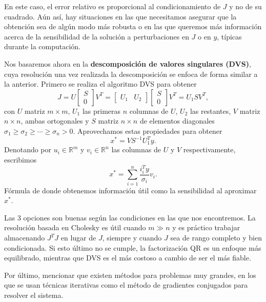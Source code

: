 \documentclass[11pt,a4paper]{book}
\theoremstyle{definition}
\theoremstyle{remark}
\begin{document}
En este caso, el error relativo es proporcional al condicionamiento de $J$ y no de su cuadrado.
Aún así, hay situaciones en las que necesitamos asegurar que la obtención sea de algún modo más robusta
o en las que queremos más información acerca de la sensibilidad de la solución a perturbaciones en $J$
o en $y$, típicas durante la computación.

Nos basaremos ahora en la \textbf{descomposición de valores singulares (DVS)}, cuya resolución una vez
realizada la descomposición se enfoca de forma similar a la anterior. Primero se realiza el algoritmo DVS
para obtener 
\begin{equation}
	J = U \left[ \begin{array}{c} S \\ 0 \end{array} \right] V^T =
	\left[ \begin{array}{cc} U_1 & U_2 \end{array} \right]
	\left[ \begin{array}{c} S \\ 0 \end{array} \right] V^T =
	U_1 S V^T,
\end{equation}
con $U$ matriz $m \times m$, $U_1$ las primeras $n$ columnas de $U$,
$U_2$ las restantes, $V$ matriz $n \times n$, ambas ortogonales y $S$
matriz $n \times n$ de elementos diagonales $\sigma_1 \geq \sigma_2 \geq \cdots \geq \sigma_n > 0$.
Aprovechamos estas propiedades para obtener
\begin{equation}
	x^* = VS^{-1}U_1^Ty.
\end{equation}
Denotando por $u_i \in \mathbb{R}^m$ y $v_i \in \mathbb{R}^n$ las columnas de $U$ y $V$ respectivamente, escribimos
\begin{equation}
	x^* = \sum_{i=1}^n \frac{i_i^Ty}{\sigma_i}v_i.
\end{equation}
Fórmula de donde obtenemos información útil como la sensibilidad al aproximar $x^*$.

Las 3 opciones son buenas según las condiciones en las que nos encontremos. La resolución basada en Cholesky es útil cuando $m\gg n$ y es práctico trabajar almacenando $J^TJ$ en lugar de $J$, siempre y cuando $J$ sea de rango completo y bien condicionada. Si esto último no se cumple, la factorización QR es un enfoque más equilibrado, mientras que DVS es el más costoso a cambio de ser el más fiable.

Por último, mencionar que existen métodos para problemas muy grandes, en los que se usan técnicas iterativas como el método de gradientes conjugados para resolver el sistema.
\end{document}
